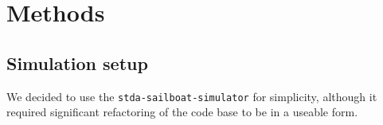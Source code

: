 \documentclass[conference]{IEEEtran}
\newcommand{\Sim}{\lstinline{stda-sailboat-simulator}\ }
\begin{document}




\section{Methods}
\subsection{Simulation setup}
We decided to use the \lstinline{stda-sailboat-simulator} for simplicity, although it required significant 
refactoring of the code base to be in a useable form.
\end{document}
